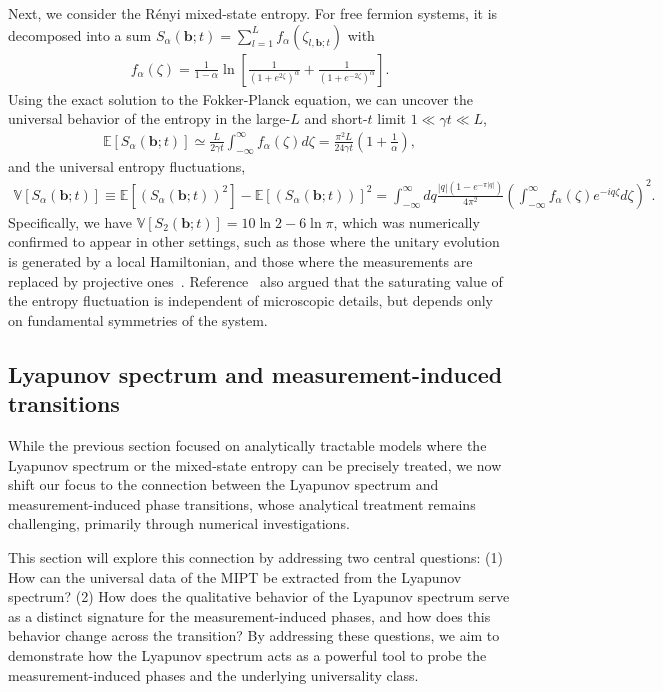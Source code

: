 \documentclass[preprint,pteplogo]{ptephy_v2}%
\numberwithin{equation}{section}
\theoremstyle{definition}
\begin{document}
Next, we consider the R\'enyi mixed-state entropy.
For free fermion systems, it is decomposed into a sum $S_\alpha(\bm{b};t)=\sum_{l=1}^L f_\alpha(\zeta_{l, \bm{b};t})$ with
\begin{align}
    f_\alpha(\zeta)=\frac{1}{1-\alpha}\ln\left[\frac{1}{(1+e^{2\zeta})^\alpha} + \frac{1}{(1+e^{-2\zeta})^\alpha}\right].
\end{align}
Using the exact solution to the Fokker-Planck equation, we can uncover the universal behavior of the entropy in the large-$L$ and short-$t$ limit $1\ll\gamma t\ll L$,
\begin{align}
    \mathbb{E}[S_\alpha(\bm{b};\!t)]\simeq \frac{L}{2\gamma t}\int_{-\infty}^\infty f_{\alpha}(\zeta)d\zeta
    =\frac{\pi^2L}{24\gamma t}\left(1 +\frac{1}{\alpha}\right),
\end{align}
and the universal entropy fluctuations,
\begin{align}
    \mathbb{V}[S_\alpha(\bm{b};\!t)]
    \equiv\mathbb{E}[(S_\alpha(\bm{b};\!t))^2] - \mathbb{E}[(S_\alpha(\bm{b};\!t))]^2
    = \int_{-\infty}^\infty dq \frac{|q|(1-e^{-\pi|q|})}{4\pi^2}
    \left(\int_{-\infty}^\infty f_\alpha(\zeta)e^{-iq\zeta}d\zeta\right)^2.
\end{align}
Specifically, we have $\mathbb{V}[S_2(\bm{b};\!t)]=10\ln2-6\ln\pi$, which was numerically confirmed to appear in other settings, such as those where the unitary evolution is generated by a local Hamiltonian, and those where the measurements are replaced by projective ones~\cite{xiao25universal}.
Reference~\cite{xiao25universal} also argued that the saturating value of the entropy fluctuation is independent of microscopic details, but depends only on fundamental symmetries of the system.


\subsection{Lyapunov spectrum and measurement-induced transitions}
\label{sec:Lyapunov-spectrum_MIPT}
While the previous section focused on analytically tractable models where the Lyapunov spectrum or the mixed-state entropy can be precisely treated, we now shift our focus to the connection between the Lyapunov spectrum and measurement-induced phase transitions, whose analytical treatment remains challenging, primarily through numerical investigations.

This section will explore this connection by addressing two central questions:
(1) How can the universal data of the MIPT be extracted from the Lyapunov spectrum?
(2) How does the qualitative behavior of the Lyapunov spectrum serve as a distinct signature for the measurement-induced phases, and how does this behavior change across the transition?
By addressing these questions, we aim to demonstrate how the Lyapunov spectrum acts as a powerful tool to probe the measurement-induced phases and the underlying universality class.
\end{document}
